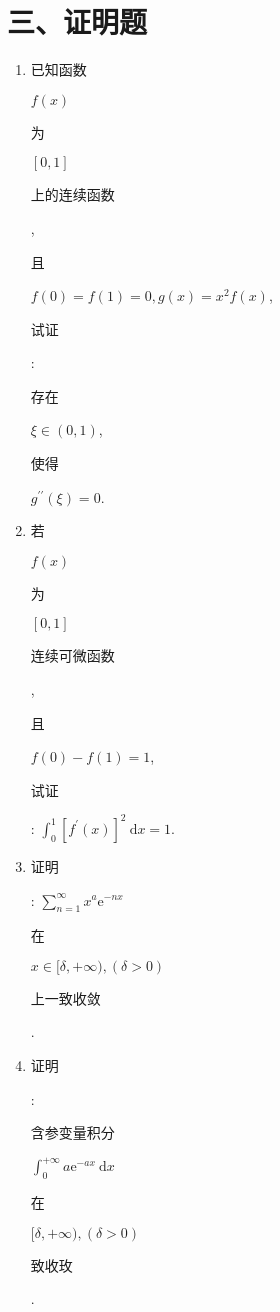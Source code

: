 \documentclass[10pt]{article}
\begin{document}
\section{三、证明题}
\begin{enumerate}
  \item \begin{CJK}{UTF8}{mj}已知函数\end{CJK} $f(x)$ \begin{CJK}{UTF8}{mj}为\end{CJK} $[0,1]$ \begin{CJK}{UTF8}{mj}上的连续函数\end{CJK}, \begin{CJK}{UTF8}{mj}且\end{CJK} $f(0)=f(1)=0, g(x)=x^{2} f(x)$, \begin{CJK}{UTF8}{mj}试证\end{CJK}: \begin{CJK}{UTF8}{mj}存在\end{CJK} $\xi \in(0,1)$, \begin{CJK}{UTF8}{mj}使得\end{CJK} $g^{\prime \prime}(\xi)=0$.

  \item \begin{CJK}{UTF8}{mj}若\end{CJK} $f(x)$ \begin{CJK}{UTF8}{mj}为\end{CJK} $[0,1]$ \begin{CJK}{UTF8}{mj}连续可微函数\end{CJK}, \begin{CJK}{UTF8}{mj}且\end{CJK} $f(0)-f(1)=1$, \begin{CJK}{UTF8}{mj}试证\end{CJK}: $\int_{0}^{1}\left[f^{\prime}(x)\right]^{2} \mathrm{~d} x=1$.

  \item \begin{CJK}{UTF8}{mj}证明\end{CJK}: $\sum_{n=1}^{\infty} x^{a} \mathrm{e}^{-n x}$ \begin{CJK}{UTF8}{mj}在\end{CJK} $x \in[\delta,+\infty),(\delta>0)$ \begin{CJK}{UTF8}{mj}上一致收敛\end{CJK}.

  \item \begin{CJK}{UTF8}{mj}证明\end{CJK}: \begin{CJK}{UTF8}{mj}含参变量积分\end{CJK} $\int_{0}^{+\infty} a \mathrm{e}^{-a x} \mathrm{~d} x$ \begin{CJK}{UTF8}{mj}在\end{CJK} $[\delta,+\infty),(\delta>0)$ \begin{CJK}{UTF8}{mj}致收玫\end{CJK}.


\end{enumerate}
\end{document}
